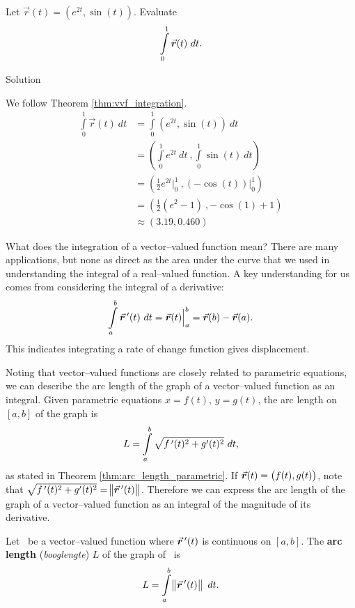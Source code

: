 \begin{example}\label{ex_vvfint1}
Let $\vec r(t) = \left( e^{2t},\sin(t)\right)$. Evaluate $$\ds \int\limits_0^1 \vec r(t) \ dt.$$


Solution 

We follow Theorem \ref{thm:vvf_integration}.
\allowdisplaybreaks
\begin{align*}
\int\limits_0^1 \vec r(t) \ dt &= \int\limits_0^1 \left( e^{2t},\sin(t)\right) \ dt \\[0.2cm]
				&= \left( \int\limits_0^1 e^{2t}\ dt\ , \int\limits_0^1 \sin(t) \ dt \right) \\[0.2cm]
				&= \left( \frac12e^{2t}\Big|_0^1\ , (-\cos(t)) \Big|_0^1\right) \\[0.2cm]
				&= \left( \frac12(e^2-1)\ , -\cos(1)+1\right)\\[0.2cm]
				&\approx \left( 3.19,0.460\right)
\end{align*}
\end{example}

What does the integration of a vector--valued function mean? There are many applications, but none as direct as the area under the curve that we used in understanding the integral of a real--valued function. A key understanding for us comes from considering the integral of a derivative: 
$$\int\limits_a^b \vrp(t)\ dt = \vec r(t)\Big|_a^b = \vec r(b)-\vec r(a).$$ This indicates integrating a rate of change function gives displacement.

Noting that vector--valued functions are closely related to parametric equations, we can describe the arc length of the graph of a vector--valued function as an integral. Given parametric equations $x=f(t)$, $y=g(t)$, the arc length on $[a,b]$ of the graph is
$$L = \int\limits_a^b\sqrt{f\,'(t)^2+g'(t)^2}\ dt,$$
as stated in Theorem \ref{thm:arc_length_parametric}. %
If $\vrt = \left( f(t), g(t)\right)$, note that $\sqrt{\fp(t)^2+g'(t)^2} = \norm{\vrp(t)}$. Therefore we can express the arc length of the graph of a vector--valued function as an integral of the magnitude of its derivative.

\begin{theorem}\label{thm:vvf_arc_length}
Let \vrt\ be a vector--valued function where $\vrp(t)$ is continuous on $[a,b]$. The \textbf{arc length} (\textit{booglengte}) $L$ of the graph of \vrt\ is 
$$L = \int\limits_a^b \norm{\vrp(t)}\ dt.$$
\end{theorem}

